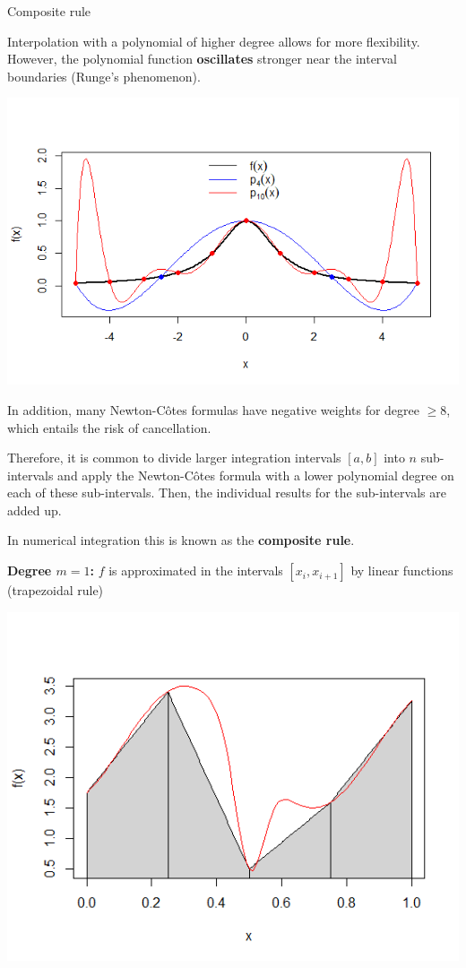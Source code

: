 \begin{vbframe}{Composite rule}

Interpolation with a polynomial of higher degree allows for more flexibility. However, the polynomial function \textbf{oscillates} stronger near the interval boundaries (Runge's phenomenon).

\begin{center}
\includegraphics[width = .8\textwidth]{figure_man/Runge.png}
\end{center}


\framebreak

In addition, many Newton-C\^{o}tes formulas have negative weights for degree $\geq 8$, which entails the risk of cancellation.

\lz

Therefore, it is common to divide larger integration intervals $[a, b]$ into $n$ sub-intervals and apply the Newton-C\^{o}tes formula with a lower polynomial degree on each of these sub-intervals. Then, the individual results for the sub-intervals are added up.

\lz

In numerical integration this is known as the \textbf{composite rule}.

\framebreak

\textbf{Degree $m = 1$:} $f$ is approximated in the intervals $[x_i, x_{i + 1}]$ by linear functions (trapezoidal rule)

\begin{center}
\includegraphics[width = .7\textwidth]{figure_man/deg1.png}
\end{center}


\end{vbframe}
